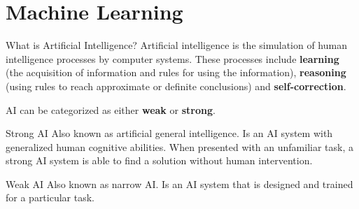 \section{Machine Learning}
\begin{frame}{What is Artificial Intelligence?}
    Artificial intelligence is the simulation of human intelligence processes by computer systems. These processes include \textbf{learning} (the acquisition of information and rules for using the information), \textbf{reasoning} (using rules to reach approximate or definite conclusions) and \textbf{self-correction}.

    \pause

    AI can be categorized as either \textbf{weak} or \textbf{strong}.

    \pause

    \begin{block}{Strong AI}
		Also known as artificial general intelligence. Is an AI system with generalized human cognitive abilities. When presented with an unfamiliar task, a strong AI system is able to find a solution without human intervention.
    \end{block}

    \pause

    \begin{block}{Weak AI}
		Also known as narrow AI. Is an AI system that is designed and trained for a particular task.
    \end{block}
\end{frame}

